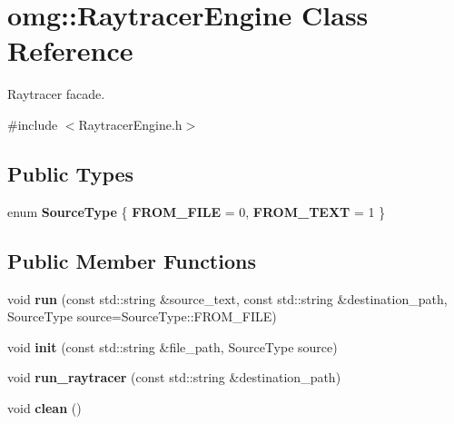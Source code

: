 \hypertarget{classomg_1_1_raytracer_engine}{}\section{omg\+::Raytracer\+Engine Class Reference}
\label{classomg_1_1_raytracer_engine}


Raytracer facade.  




{\ttfamily \#include $<$Raytracer\+Engine.\+h$>$}

\subsection*{Public Types}
\begin{DoxyCompactItemize}
\item 
\mbox{\label{classomg_1_1_raytracer_engine_ae5f2a431ac187584cc1eac2d4ec09140}} 
enum {\bfseries Source\+Type} \{ {\bfseries F\+R\+O\+M\+\_\+\+F\+I\+LE} = 0, 
{\bfseries F\+R\+O\+M\+\_\+\+T\+E\+XT} = 1
 \}
\end{DoxyCompactItemize}
\subsection*{Public Member Functions}
\begin{DoxyCompactItemize}
\item 
\mbox{\label{classomg_1_1_raytracer_engine_aa38fbd79d303fc1dd8bc7957fd8b2fba}} 
void {\bfseries run} (const std\+::string \&source\+\_\+text, const std\+::string \&destination\+\_\+path, Source\+Type source=Source\+Type\+::\+F\+R\+O\+M\+\_\+\+F\+I\+LE)
\item 
\mbox{\label{classomg_1_1_raytracer_engine_a38f6a68330403c83e6a03671939afadc}} 
void {\bfseries init} (const std\+::string \&file\+\_\+path, Source\+Type source)
\item 
\mbox{\label{classomg_1_1_raytracer_engine_af2d1a3cdd99068161062bdeebb9ad410}} 
void {\bfseries run\+\_\+raytracer} (const std\+::string \&destination\+\_\+path)
\item 
\mbox{\label{classomg_1_1_raytracer_engine_aea20f9b8fac6901e0428f2ce43069923}} 
void {\bfseries clean} ()
\end{DoxyCompactItemize}


